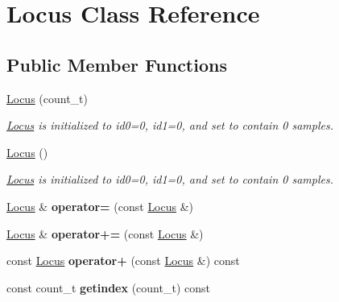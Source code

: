 \hypertarget{classLocus}{\section{Locus Class Reference}
\label{classLocus}
}
\subsection*{Public Member Functions}
\begin{DoxyCompactItemize}
\item 
\hypertarget{classLocus_a0bee741faae71aa0bb9d809e0b98f3c3}{\hyperlink{classLocus_a0bee741faae71aa0bb9d809e0b98f3c3}{Locus} (count\-\_\-t)}\label{classLocus_a0bee741faae71aa0bb9d809e0b98f3c3}

\begin{DoxyCompactList}\small\item\em \hyperlink{classLocus}{Locus} is initialized to id0=0, id1=0, and set to contain 0 samples. \end{DoxyCompactList}\item 
\hypertarget{classLocus_a66f73ca4df29ccd3cb96118a81ea2d38}{\hyperlink{classLocus_a66f73ca4df29ccd3cb96118a81ea2d38}{Locus} ()}\label{classLocus_a66f73ca4df29ccd3cb96118a81ea2d38}

\begin{DoxyCompactList}\small\item\em \hyperlink{classLocus}{Locus} is initialized to id0=0, id1=0, and set to contain 0 samples. \end{DoxyCompactList}\item 
\hypertarget{classLocus_a10fa5e45cb2e6d773011709ec24df6ea}{\hyperlink{classLocus}{Locus} \& {\bfseries operator=} (const \hyperlink{classLocus}{Locus} \&)}\label{classLocus_a10fa5e45cb2e6d773011709ec24df6ea}

\item 
\hypertarget{classLocus_a1f7ae8e08054efe9ea5494355234c9a1}{\hyperlink{classLocus}{Locus} \& {\bfseries operator+=} (const \hyperlink{classLocus}{Locus} \&)}\label{classLocus_a1f7ae8e08054efe9ea5494355234c9a1}

\item 
\hypertarget{classLocus_ae052797fc97726c62b7833b28d3fbafc}{const \hyperlink{classLocus}{Locus} {\bfseries operator+} (const \hyperlink{classLocus}{Locus} \&) const }\label{classLocus_ae052797fc97726c62b7833b28d3fbafc}

\item 
\hypertarget{classLocus_ae3ad620c40a800ef73992da5766839c1}{const count\-\_\-t {\bfseries getindex} (count\-\_\-t) const }\label{classLocus_ae3ad620c40a800ef73992da5766839c1}


\end{DoxyCompactItemize}
